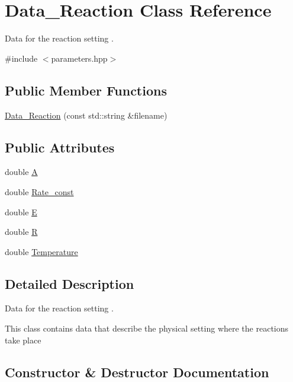 \hypertarget{classData__Reaction}{}\section{Data\+\_\+\+Reaction Class Reference}
\label{classData__Reaction}


Data for the reaction setting .  




{\ttfamily \#include $<$parameters.\+hpp$>$}

\subsection*{Public Member Functions}
\begin{DoxyCompactItemize}
\item 
\hyperlink{classData__Reaction_a0300de681e8247375735026ce4c1644d}{Data\+\_\+\+Reaction} (const std\+::string \&filename)
\end{DoxyCompactItemize}
\subsection*{Public Attributes}
\begin{DoxyCompactItemize}
\item 
double \hyperlink{classData__Reaction_a64fde91b63cd2cdf9d0b1e863b3f715a}{A}
\item 
double \hyperlink{classData__Reaction_affb4be693adaa72df68fe22f0f96e2de}{Rate\+\_\+const}
\item 
double \hyperlink{classData__Reaction_a468fe63377f2a642fabbf6083f899ccd}{E}
\item 
double \hyperlink{classData__Reaction_a3cf13b7fd059ce3d14dc6a08cc1e4550}{R}
\item 
double \hyperlink{classData__Reaction_a293b70ca46d6c090bca2d68de4669e3f}{Temperature}
\end{DoxyCompactItemize}


\subsection{Detailed Description}
Data for the reaction setting . 

This class contains data that describe the physical setting where the reactions take place 

\subsection{Constructor \& Destructor Documentation}
\mbox{\label{classData__Reaction_a0300de681e8247375735026ce4c1644d}} 
